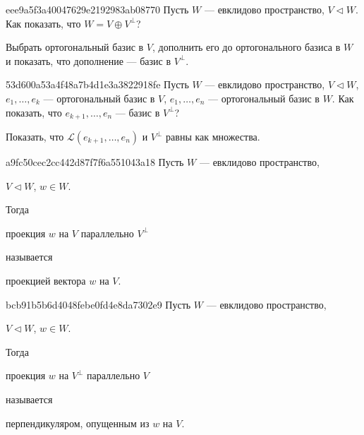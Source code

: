 \begin{note}{eee9a5f3a40047629e2192983ab08770}
    Пусть \({ W }\) --- евклидово пространство, \({ V \triangleleft W }\).
    Как показать, что \({ W = V \oplus V^{\perp} }\)?

    \begin{cloze}{1}
        Выбрать ортогональный базис в \({ V }\), дополнить его до ортогонального базиса в \({ W }\) и показать, что дополнение --- базис в \({ V^{\perp} }\).
    \end{cloze}
\end{note}

\begin{note}{53d600a53a4f48a7b4d1e3a3822918fe}
    Пусть \({ W }\) --- евклидово пространство, \({ V \triangleleft W }\),
    \({ e_1, \ldots, e_k }\) --- ортогональный базис в \({ V }\), \({ e_1, \ldots, e_n }\) --- ортогональный базис в \({ W }\).
    Как показать, что \({ e_{k + 1}, \ldots, e_n }\) --- базис в \({ V^{\perp} }\)?

    \begin{cloze}{1}
        Показать, что \({ \mathscr L (e_{k + 1}, \ldots, e_n) }\) и \({ V^{\perp} }\) равны как множества.
    \end{cloze}
\end{note}

\begin{note}{a9fc50cec2cc442d87f7f6a551043a18}
    Пусть \({ W }\) --- евклидово пространство, \begin{icloze}{3}\({ V \triangleleft W }\), \({ w \in W }\).\end{icloze}
    Тогда \begin{icloze}{1}проекция \({ w }\) на \({ V }\) параллельно \({ V^{\perp} }\)\end{icloze} называется \begin{icloze}{2}проекцией вектора \({ w }\) на \({ V }\).\end{icloze}
\end{note}

\begin{note}{bcb91b5b6d4048febe0fd4e8da7302e9}
    Пусть \({ W }\) --- евклидово пространство, \begin{icloze}{3}\({ V \triangleleft W }\), \({ w \in W }\).\end{icloze}
    Тогда \begin{icloze}{1}проекция \({ w }\) на \({ V^{\perp} }\) параллельно \({ V }\)\end{icloze} называется \begin{icloze}{2}перпендикуляром, опущенным из \({ w }\) на \({ V }\).\end{icloze}
\end{note}

